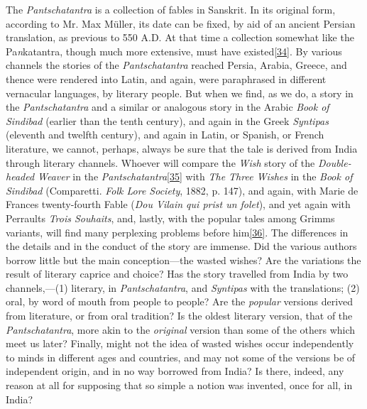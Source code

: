 \documentclass[14pt,a4paper]{memoir}
\begin{document}
The \emph{Pantschatantra} is a collection of fables in Sanskrit. In its
original form, according to Mr. Max Müller, its date can be fixed, by
aid of an ancient Persian translation, as previous to 550 {A.D.}
\textquotesingle At that time a collection somewhat like the
Pa\emph{n}katantra, though much more extensive, must have
existed\protect\hypertarget{4533318093929944247_33931-h-0.htm.xhtmlux5cux23FNanchor_34}{}{}\protect\hyperlink{4533318093929944247_33931-h-0.htm.xhtmlux5cux23Footnote_34}{{[}34{]}}.\textquotesingle{}
By various channels the stories of the \emph{Pantschatantra} reached
Persia, Arabia, Greece, and thence were rendered into Latin, and again,
were paraphrased in different vernacular languages, by literary people.
But when we find, as we do, a story in the \emph{Pantschatantra} and a
similar or analogous story in the Arabic \emph{Book of Sindibad}
(earlier than the tenth century), and again in the Greek \emph{Syntipas}
(eleventh and twelfth century), and again in Latin, or Spanish, or
French literature, we cannot, perhaps, always be sure that the tale is
derived from India through literary channels. Whoever will compare the
\emph{Wish} story of the \emph{Double-headed Weaver} in the
\emph{Pantschatantra}\protect\hypertarget{4533318093929944247_33931-h-0.htm.xhtmlux5cux23FNanchor_35}{}{}\protect\hyperlink{4533318093929944247_33931-h-0.htm.xhtmlux5cux23Footnote_35}{{[}35{]}}
with \emph{The Three Wishes} in the \emph{Book of Sindibad} (Comparetti.
\emph{Folk Lore Society}, 1882, p. 147), and again, with Marie de
France\textquotesingle s twenty-fourth Fable (\emph{Dou Vilain qui prist
un folet}), and yet again with Perrault\textquotesingle s \emph{Trois
Souhaits}, and, lastly, with the popular tales among
Grimm\textquotesingle s variants, will find many perplexing problems
before
him\protect\hypertarget{4533318093929944247_33931-h-0.htm.xhtmlux5cux23FNanchor_36}{}{}\protect\hyperlink{4533318093929944247_33931-h-0.htm.xhtmlux5cux23Footnote_36}{{[}36{]}}.
The differences in the details and in the conduct of the story are
immense. Did the various authors borrow little but the main
conception---the wasted wishes? Are the variations the result of
literary caprice and choice? Has the story travelled from India by two
channels,---(1) literary, in \emph{Pantschatantra}, and \emph{Syntipas}
with the translations; (2) oral, by word of mouth from people to people?
Are the \emph{popular} versions derived from literature, or from oral
tradition? Is the oldest literary version, that of the
\emph{Pantschatantra}, more akin to the \emph{original} version than
some of the others which meet us later? Finally, might not the idea of
wasted wishes occur independently to minds in different ages and
countries, and may not some of the versions be of independent origin,
and in no way borrowed from India? Is there, indeed, any reason at all
for supposing that so simple a notion was invented, once for all, in
India?
\end{document}
